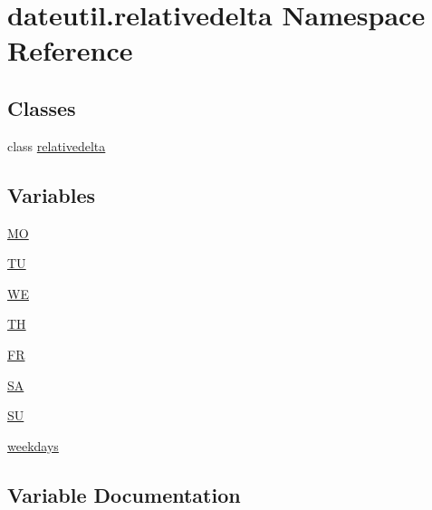 \hypertarget{namespacedateutil_1_1relativedelta}{}\section{dateutil.\+relativedelta Namespace Reference}
\label{namespacedateutil_1_1relativedelta}
\subsection*{Classes}
\begin{DoxyCompactItemize}
\item 
class \hyperlink{classdateutil_1_1relativedelta_1_1relativedelta}{relativedelta}
\end{DoxyCompactItemize}
\subsection*{Variables}
\begin{DoxyCompactItemize}
\item 
\hyperlink{namespacedateutil_1_1relativedelta_a3753fb0d38db597e31f95575cf6486ed}{MO}
\item 
\hyperlink{namespacedateutil_1_1relativedelta_a15a1c4634cbf07668d1c335db4a26b01}{TU}
\item 
\hyperlink{namespacedateutil_1_1relativedelta_aeaec173195d5879821be6f50de5f249c}{WE}
\item 
\hyperlink{namespacedateutil_1_1relativedelta_abfa3619ebe54e38fa2c4604ca94cdb97}{TH}
\item 
\hyperlink{namespacedateutil_1_1relativedelta_ada94e2b2f2cc573bb43798dcd9741c93}{FR}
\item 
\hyperlink{namespacedateutil_1_1relativedelta_a920bcde57412b8dee21b0dcc689041e8}{SA}
\item 
\hyperlink{namespacedateutil_1_1relativedelta_afd57f32bc5a97848b517f321f0059092}{SU}
\item 
\hyperlink{namespacedateutil_1_1relativedelta_a20f209abf2caf17ce94c2a166295fc13}{weekdays}
\end{DoxyCompactItemize}


\subsection{Variable Documentation}
\mbox{\label{namespacedateutil_1_1relativedelta_ada94e2b2f2cc573bb43798dcd9741c93}} 
